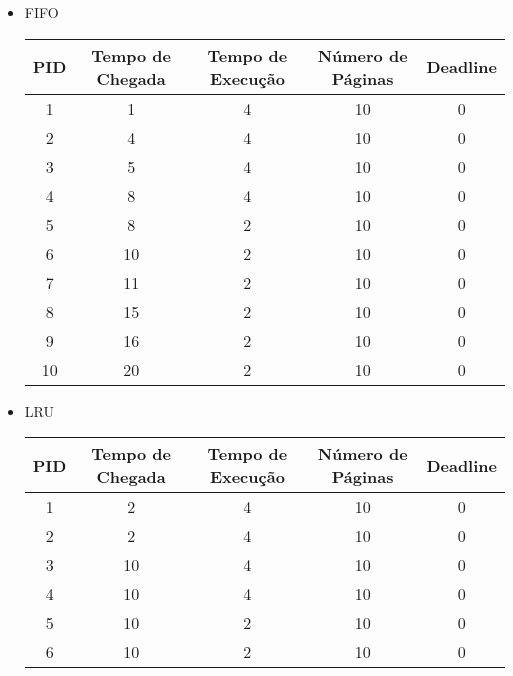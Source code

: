 \documentclass{article}
\begin{document}
\begin{itemize}
	\item FIFO
		\begin{table}[!htbp]
		\centering
		\label{undefined}
		\begin{tabular}{|c|c|c|c|c|}
		\hline
		PID & Tempo de Chegada & Tempo de Execução & Número de Páginas & Deadline \\ \hline
   		1&    1&    4&    10& 0\\ \hline
   		2&    4&   4&    10& 0\\ \hline
   		3&    5&   4&    10& 0	\\ \hline
   		4&    8&   4&    10& 0	\\ \hline
   		5&    8&   2&    10& 0	\\ \hline
   		6&    10&   2&    10& 0\\ \hline
   		7&    11&   2&    10& 0\\ \hline
   		8&    15&   2&    10& 0\\ \hline
   		9&    16&   2&    10& 0\\ \hline
   		10&   20&   2&   10& 0\\ \hline
		\end{tabular}
		\end{table}

	\item LRU	
		\begin{table}[!htbp]
		\centering
		\label{undefined}
		\begin{tabular}{|c|c|c|c|c|}
		\hline
		PID & Tempo de Chegada & Tempo de Execução & Número de Páginas & Deadline \\ \hline
   		1&     2& 4&    10& 0\\ \hline
   		2&    2& 4&    10& 0\\ \hline
   		3&    10&   4&    10& 0	\\ \hline
   		4&    10&   4&    10& 0	\\ \hline
   		5&    10&   2&    10& 0	\\ \hline
   		6&    10&   2&    10& 0	\\ \hline
		\end{tabular}
		\end{table}
\end{itemize}
\end{document}

